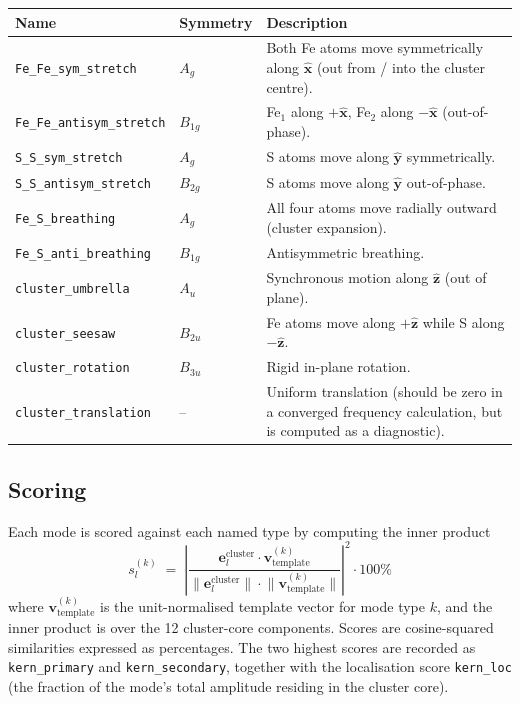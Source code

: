 \documentclass[10pt,a4paper,twoside]{article}
\newcommand{\evec}{\mathbf{e}}
\newcommand{\xhat}{\hat{\mathbf{x}}}
\newcommand{\yhat}{\hat{\mathbf{y}}}
\newcommand{\zhat}{\hat{\mathbf{z}}}
\newcommand{\codref}[1]{%
  \quad\text{\textcolor{gray!70!black}{\footnotesize $\rightsquigarrow$~\texttt{#1}}}}
\begin{document}
\begin{longtable}{p{} p{} p{}}
\toprule
\textbf{Name} & \textbf{Symmetry} & \textbf{Description} \\
\midrule
\texttt{Fe\_Fe\_sym\_stretch}
  & $A_g$ & Both Fe atoms move symmetrically along $\xhat$
            (out from / into the cluster centre). \\
\texttt{Fe\_Fe\_antisym\_stretch}
  & $B_{1g}$ & Fe$_1$ along $+\xhat$, Fe$_2$ along $-\xhat$
              (out-of-phase). \\
\texttt{S\_S\_sym\_stretch}
  & $A_g$ & S atoms move along $\yhat$ symmetrically. \\
\texttt{S\_S\_antisym\_stretch}
  & $B_{2g}$ & S atoms move along $\yhat$ out-of-phase. \\
\texttt{Fe\_S\_breathing}
  & $A_g$ & All four atoms move radially outward (cluster expansion). \\
\texttt{Fe\_S\_anti\_breathing}
  & $B_{1g}$ & Antisymmetric breathing. \\
\texttt{cluster\_umbrella}
  & $A_u$ & Synchronous motion along $\zhat$ (out of plane). \\
\texttt{cluster\_seesaw}
  & $B_{2u}$ & Fe atoms move along $+\zhat$ while S along $-\zhat$. \\
\texttt{cluster\_rotation}
  & $B_{3u}$ & Rigid in-plane rotation. \\
\texttt{cluster\_translation}
  & --  & Uniform translation (should be zero in a converged
          frequency calculation, but is computed as a diagnostic). \\
\bottomrule
\end{longtable}

\subsection{Scoring}

\codref{core.classify\_oop\_inp}

Each mode is scored against each named type by computing the inner
product
\begin{equation}
  s_l^{(k)}
    \;=\;
  \left\lvert\frac{\evec_l^\text{cluster} \cdot
                   \mathbf{v}^{(k)}_\text{template}}
                  {\lVert\evec_l^\text{cluster}\rVert
                   \cdot \lVert\mathbf{v}^{(k)}_\text{template}\rVert}
       \right\rvert^2 \cdot 100\%
\end{equation}
where $\mathbf{v}^{(k)}_\text{template}$ is the unit-normalised
template vector for mode type $k$, and the inner product is over
the 12 cluster-core components. Scores are cosine-squared
similarities expressed as percentages. The two highest scores are
recorded as \texttt{kern\_primary} and \texttt{kern\_secondary},
together with the localisation score \texttt{kern\_loc} (the
fraction of the mode's total amplitude residing in the cluster
core).
\end{document}
